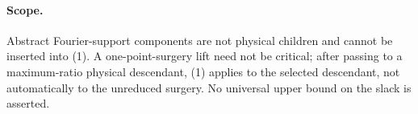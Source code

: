 \paragraph{Scope.}
Abstract Fourier-support components are not physical children and cannot be
inserted into (1).  A one-point-surgery lift need not be critical; after
passing to a maximum-ratio physical descendant, (1) applies to the selected
descendant, not automatically to the unreduced surgery.  No universal upper
bound on the slack is asserted.
